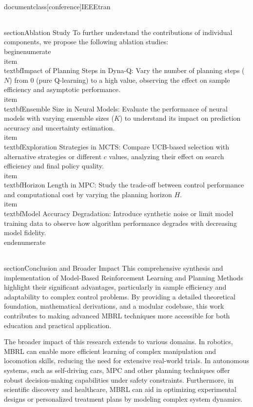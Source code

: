 \\documentclass[conference]{IEEEtran}
\begin{document}
\\section{Ablation Study}
To further understand the contributions of individual components, we propose the following ablation studies:
\\begin{enumerate}
    \\item \\textbf{Impact of Planning Steps in Dyna-Q}: Vary the number of planning steps ($N$) from 0 (pure Q-learning) to a high value, observing the effect on sample efficiency and asymptotic performance.
    \\item \\textbf{Ensemble Size in Neural Models}: Evaluate the performance of neural models with varying ensemble sizes ($K$) to understand its impact on prediction accuracy and uncertainty estimation.
    \\item \\textbf{Exploration Strategies in MCTS}: Compare UCB-based selection with alternative strategies or different $c$ values, analyzing their effect on search efficiency and final policy quality.
    \\item \\textbf{Horizon Length in MPC}: Study the trade-off between control performance and computational cost by varying the planning horizon $H$.
    \\item \\textbf{Model Accuracy Degradation}: Introduce synthetic noise or limit model training data to observe how algorithm performance degrades with decreasing model fidelity.
\\end{enumerate}

\\section{Conclusion and Broader Impact}
This comprehensive synthesis and implementation of Model-Based Reinforcement Learning and Planning Methods highlight their significant advantages, particularly in sample efficiency and adaptability to complex control problems. By providing a detailed theoretical foundation, mathematical derivations, and a modular codebase, this work contributes to making advanced MBRL techniques more accessible for both education and practical application.

The broader impact of this research extends to various domains. In robotics, MBRL can enable more efficient learning of complex manipulation and locomotion skills, reducing the need for extensive real-world trials. In autonomous systems, such as self-driving cars, MPC and other planning techniques offer robust decision-making capabilities under safety constraints. Furthermore, in scientific discovery and healthcare, MBRL can aid in optimizing experimental designs or personalized treatment plans by modeling complex system dynamics.
\end{document}
